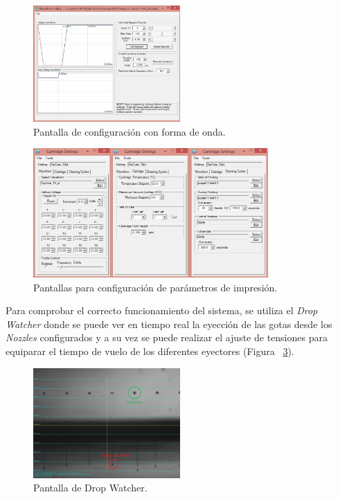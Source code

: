 \begin{figure}[H]
  \centering
    \includegraphics[width=0.5\textwidth]{Figuras/Figura_Pantalla_Waveform}
  \caption{Pantalla de configuración con forma de onda.}
  \label{fig:Figura_Pantalla_Waveform}
\end{figure}

\begin{figure}[H]
  \centering
    \includegraphics[width=0.8\textwidth]{Figuras/Figura_Configuraciones_cartucho}
  \caption{Pantallas para configuración de parámetros de impresión.}
  \label{fig:Figura_Configuraciones_cartucho}
\end{figure}

Para comprobar el correcto funcionamiento del sistema, se utiliza el \textit{Drop Watcher} donde se puede ver en tiempo real la eyección de las gotas desde los \textit{Nozzles} configurados y a su vez se puede realizar el ajuste de tensiones para equiparar el tiempo de vuelo de los diferentes eyectores (Figura ~\ref{fig:Figura_drop_watcher1}).

\begin{figure}[H]
  \centering
    \includegraphics[width=0.5\textwidth]{Figuras/Figura_drop_watcher1}
  \caption{Pantalla de Drop Watcher.}
  \label{fig:Figura_drop_watcher1}
\end{figure}

